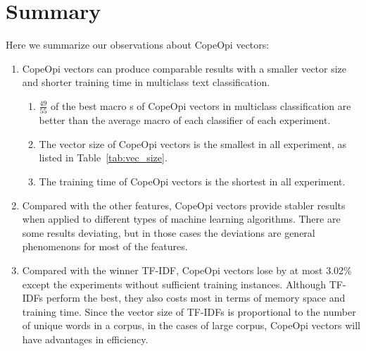 

\vspace{-1.75\intextsep}


\vspace{-1.75\intextsep}


\vspace{-1.75\intextsep}



\section{Summary}
Here we summarize our observations about CopeOpi vectors:
\begin{enumerate}
\item CopeOpi vectors can produce comparable results with a smaller vector size and shorter training time in multiclass text classification.
\begin{enumerate}[label=(\roman*)]
\item $\frac{49}{55}$ of the best macro \fscore{}s of CopeOpi vectors in multiclass classification are better than the average macro \fscore{} of each classifier of each experiment.
\item The vector size of CopeOpi vectors is the smallest in all experiment, as listed in Table~\ref{tab:vec_size}.
\item The training time of CopeOpi vectors is the shortest in all experiment.
\end{enumerate}
\item Compared with the other features, CopeOpi vectors provide stabler results when applied to different types of machine learning algorithms. There are some results deviating, but in those cases the deviations are general phenomenons for most of the features.
\item Compared with the winner TF-IDF, CopeOpi vectors lose by at most 3.02\% except the experiments without sufficient training instances. Although TF-IDFs perform the best, they also costs most in terms of memory space and training time. Since the vector size of TF-IDFs is proportional to the number of unique words in a corpus, in the cases of large corpus, CopeOpi vectors will have advantages in efficiency.
\end{enumerate}
